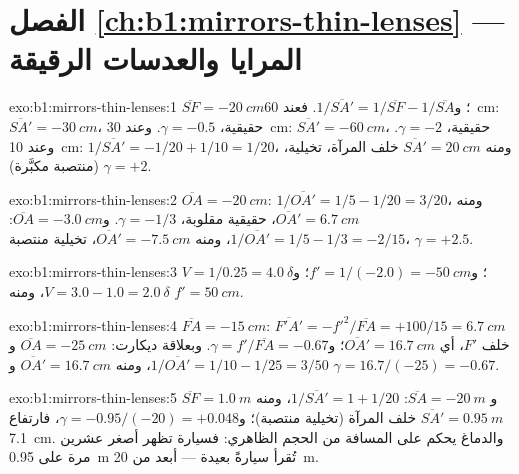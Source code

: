 \section*{الفصل \ref{ch:b1:mirrors-thin-lenses} --- المرايا والعدسات الرقيقة}

\begin{solution}{exo:b1:mirrors-thin-lenses:1}
$\overline{SF} = \qty{-20}{cm}$؛ و$1/\overline{SA'} = 1/\overline{SF} -
1/\overline{SA}$. فعند \qty{60}{cm}: $\overline{SA'} = \qty{-30}{cm}$،
حقيقية، $\gamma = -0.5$. وعند \qty{30}{cm}: $\overline{SA'} = \qty{-60}{cm}$،
حقيقية، $\gamma = -2$. وعند \qty{10}{cm}: $1/\overline{SA'} = -1/20 + 1/10
= 1/20$، ومنه $\overline{SA'} = \qty{+20}{cm}$ خلف المرآة، تخيلية،
$\gamma = +2$ (منتصبة مكبَّرة).
\end{solution}

\begin{solution}{exo:b1:mirrors-thin-lenses:2}
$\overline{OA} = \qty{-20}{cm}$: $1/\overline{OA'} = 1/5 - 1/20 = 3/20$،
ومنه $\overline{OA'} = \qty{+6.7}{cm}$، حقيقية مقلوبة، $\gamma = -1/3$.
و$\overline{OA} = \qty{-3.0}{cm}$: $1/\overline{OA'} = 1/5 - 1/3 = -2/15$،
ومنه $\overline{OA'} = \qty{-7.5}{cm}$، تخيلية منتصبة، $\gamma = +2.5$.
\end{solution}

\begin{solution}{exo:b1:mirrors-thin-lenses:3}
$V = 1/0.25 = \qty{+4.0}{\delta}$؛ و$f' = 1/(-2.0) = \qty{-50}{cm}$؛
و$V = 3.0 - 1.0 = \qty{+2.0}{\delta}$، ومنه $f' = \qty{50}{cm}$.
\end{solution}

\begin{solution}{exo:b1:mirrors-thin-lenses:4}
$\overline{FA} = \qty{-15}{cm}$: $\overline{F'A'} = -f'^2/\overline{FA}
= +100/15 = \qty{6.7}{cm}$ خلف $F'$، أي $\overline{OA'} = \qty{16.7}{cm}$؛
و$\gamma = f'/\overline{FA} = -0.67$. وبعلاقة ديكارت: $\overline{OA} =
\qty{-25}{cm}$ و $1/\overline{OA'} = 1/10 - 1/25 = 3/50$، ومنه
$\overline{OA'} = \qty{16.7}{cm}$ و $\gamma = 16.7/(-25) = -0.67$.
\end{solution}

\begin{solution}{exo:b1:mirrors-thin-lenses:5}
$\overline{SF} = \qty{+1.0}{m}$ و $\overline{SA} = \qty{-20}{m}$:
$1/\overline{SA'} = 1 + 1/20$، ومنه $\overline{SA'} = \qty{0.95}{m}$ خلف
المرآة (تخيلية منتصبة)؛ و$\gamma = -0.95/(-20) = +0.048$، فارتفاع 
\qty{7.1}{cm}. والدماغ يحكم على المسافة من الحجم الظاهري: فسيارة
تظهر أصغر عشرين مرة على \qty{0.95}{m} تُقرأ سيارةً بعيدة
--- أبعد من \qty{20}{m}.
\end{solution}

